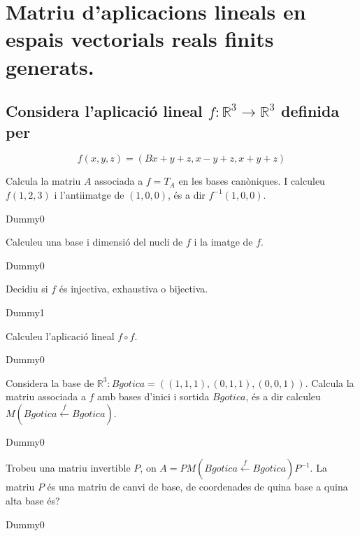 \documentclass[a4paper, 12pt]{article}
\begin{document}
    \section{Matriu d'aplicacions lineals en espais vectorials reals finits generats.}
    \subsection{Considera l'aplicació lineal $f: \mathbb{R}^3 \rightarrow \mathbb{R}^3$ definida per}
    \begin{displaymath}
        f(x,y,z) = (Bx+y+z, x-y+z, x+y+z)
    \end{displaymath}
    \begin{exercici}
        Calcula la matriu $A$ associada a $f = T_A$ en les bases canòniques. I calculeu $f(1,2,3)$ i l'antiimatge de $(1,0,0)$, és a dir $f^{-1}(1,0,0)$.
    \end{exercici}
    \begin{solucio}
        Dummy0
    \end{solucio}
    \begin{exercici}
        Calculeu una base i dimensió del nucli de $f$ i la imatge de $f$.
    \end{exercici}
    \begin{solucio}
        Dummy0
    \end{solucio}
    \begin{exercici}
        Decidiu si $f$ és injectiva, exhaustiva o bijectiva.
    \end{exercici}
    \begin{solucio}
        Dummy1
    \end{solucio}
    \begin{exercici}
        Calculeu l'aplicació lineal $f \circ f$.
    \end{exercici}
    \begin{solucio}
        Dummy0
    \end{solucio}
    \begin{exercici}
        Considera la base de $\mathbb{R}^3: Bgotica = ((1,1,1), (0,1,1), (0,0,1))$. Calcula la
        matriu associada a $f$ amb bases d'inici i sortida $Bgotica$, és a dir calculeu $M(Bgotica \xleftarrow{f} Bgotica)$.
    \end{exercici}
    \begin{solucio}
        Dummy0
    \end{solucio}
    \begin{exercici}
        Trobeu una matriu invertible $P$, on $A = PM(Bgotica \xleftarrow{f} Bgotica)P^{-1}$. La
        matriu $P$ és una matriu de canvi de base, de coordenades de quina base a quina alta base és?
    \end{exercici}
    \begin{solucio}
        Dummy0
    \end{solucio}
    
\end{document}
